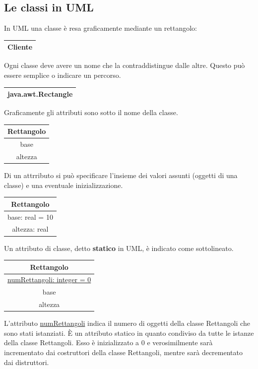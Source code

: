 \documentclass[12pt]{report}
\begin{document}
\subsection{Le classi in UML}
In UML una classe è resa graficamente mediante un rettangolo:
\begin{center}
	\begin{tabular}{|c|}
		\hline
		Cliente \\
		\hline
	\end{tabular}
\end{center}
Ogni classe deve avere un nome che la contraddistingue dalle altre. Questo può essere semplice o indicare un percorso.
\begin{center}
	\begin{tabular}{|c|}
		\hline
		java.awt.Rectangle \\
		\hline
	\end{tabular}
\end{center}
Graficamente gli attributi sono sotto il nome della classe.
\begin{center}
	\begin{tabular}{|c|}
		\hline
		Rettangolo \\
		\hline
		base \\
		altezza \\
		\hline
	\end{tabular}
\end{center}
Di un attrributo si può specificare l'insieme dei valori assunti (oggetti di una classe) e una eventuale inizializzazione.
\begin{center}
	\begin{tabular}{|c|}
		\hline
		Rettangolo \\
		\hline
		base: real = 10 \\
		altezza: real \\
		\hline
	\end{tabular}
\end{center}
Un attributo di classe, detto \textbf{statico} in UML, è indicato come sottolineato.
\begin{center}
	\begin{tabular}{|c|}
		\hline
		Rettangolo \\
		\hline
		\underline{numRettangoli: integer = 0} \\
		base \\
		altezza \\
		\hline
	\end{tabular}
\end{center}
L'attributo \underline{numRettangoli} indica il numero di oggetti della classe Rettangoli che sono stati istanziati. È un attributo statico in quanto condiviso da tutte le istanze della classe Rettangoli. Esso è inizializzato a 0 e verosimilmente sarà incrementato dai costruttori della classe Rettangoli, mentre sarà decrementato dai distruttori. \\
\end{document}
